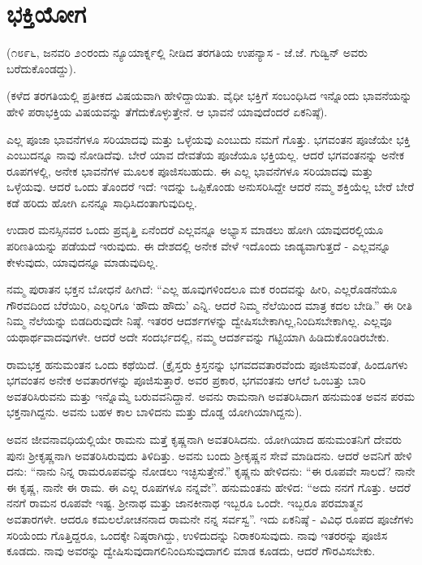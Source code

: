 
\chapter{ಭಕ್ತಿಯೋಗ}

(೧೮೯೬, ಜನವರಿ ೨೦ರಂದು ನ್ಯೂಯಾರ್ಕ್ನಲ್ಲಿ ನೀಡಿದ ತರಗತಿಯ ಉಪನ್ಯಾಸ - ಜೆ.ಜೆ. ಗುಡ್ವಿನ್ ಅವರು ಬರೆದುಕೊಂಡದ್ದು).

(ಕಳೆದ ತರಗತಿಯಲ್ಲಿ ಪ್ರತೀಕದ ವಿಷಯವಾಗಿ ಹೇಳಿದ್ದಾಯಿತು. ವೈಧೀ ಭಕ್ತಿಗೆ ಸಂಬಂಧಿಸಿದ ಇನ್ನೊಂದು ಭಾವನೆಯನ್ನು ಹೇಳಿ ಪರಾಭಕ್ತಿಯ ವಿಷಯವನ್ನು ತೆಗೆದುಕೊಳ್ಳುತ್ತೇನೆ. ಆ ಭಾವನೆ ಯಾವುದೆಂದರೆ ಏಕನಿಷ್ಠೆ).

ಎಲ್ಲ ಪೂಜಾ ಭಾವನೆಗಳೂ ಸರಿಯಾದವು ಮತ್ತು ಒಳ್ಳೆಯವು ಎಂಬುದು ನಮಗೆ ಗೊತ್ತು. ಭಗವಂತನ ಪೂಜೆಯೇ ಭಕ್ತಿ ಎಂಬುದನ್ನೂ ನಾವು ನೋಡಿದೆವು. ಬೇರೆ ಯಾವ ದೇವತೆಯ ಪೂಜೆಯೂ ಭಕ್ತಿಯಲ್ಲ. ಆದರೆ ಭಗವಂತನನ್ನು ಅನೇಕ ರೂಪಗಳಲ್ಲಿ, ಅನೇಕ ಭಾವನೆಗಳ ಮೂಲಕ ಪೂಜಿಸಬಹುದು. ಈ ಎಲ್ಲ ಭಾವನೆಗಳೂ ಸರಿಯಾದವು ಮತ್ತು ಒಳ್ಳೆಯವು. ಆದರೆ ಒಂದು ತೊಂದರೆ ಇದೆ: ಇದನ್ನು ಒಪ್ಪಿಕೊಂಡು ಅನುಸರಿಸಿದ್ದೇ ಆದರೆ ನಮ್ಮ ಶಕ್ತಿಯೆಲ್ಲ ಬೇರೆ ಬೇರೆ ಕಡೆ ಹರಿದು ಹೋಗಿ ಏನನ್ನೂ ಸಾಧಿಸಿದಂತಾಗುವುದಿಲ್ಲ.

ಉದಾರ ಮನಸ್ಸಿನವರ ಒಂದು ಪ್ರವೃತ್ತಿ ಏನೆಂದರೆ ಎಲ್ಲವನ್ನೂ ಅಭ್ಯಾಸ ಮಾಡಲು ಹೋಗಿ ಯಾವುದರಲ್ಲಿಯೂ ಪರಿಣತಿಯನ್ನು ಪಡೆಯದೆ ಇರುವುದು. ಈ ದೇಶದಲ್ಲಿ ಅನೇಕ ವೇಳೆ ಇದೊಂದು ಜಾಡ್ಯವಾಗುತ್ತದೆ - ಎಲ್ಲವನ್ನೂ ಕೇಳುವುದು, ಯಾವುದನ್ನೂ ಮಾಡುವುದಿಲ್ಲ.

ನಮ್ಮ ಪುರಾತನ ಭಕ್ತನ ಬೋಧನೆ ಹೀಗಿದೆ: “ಎಲ್ಲ ಹೂವುಗಳಿಂದಲೂ ಮಕ ರಂದವನ್ನು ಹೀರಿ, ಎಲ್ಲರೊಡನೆಯೂ ಗೌರವದಿಂದ ಬೆರೆಯಿರಿ, ಎಲ್ಲರಿಗೂ ‘ಹೌದು ಹೌದು’ ಎನ್ನಿ. ಆದರೆ ನಿಮ್ಮ ನೆಲೆಯಿಂದ ಮಾತ್ರ ಕದಲ ಬೇಡಿ.” ಈ ರೀತಿ ನಿಮ್ಮ ನೆಲೆಯನ್ನು ಬಿಡದಿರುವುದೇ ನಿಷ್ಠೆ. ಇತರರ ಆದರ್ಶಗಳನ್ನು ದ್ವೇಷಿಸಬೇಕಾಗಿಲ್ಲ,ನಿಂದಿಸಬೇಕಾಗಿಲ್ಲ. ಎಲ್ಲವೂ ಯಥಾರ್ಥವಾದವುಗಳೇ. ಆದರೆ ಅದೇ ಸಂದರ್ಭದಲ್ಲಿ, ನಮ್ಮ ಆದರ್ಶವನ್ನು ಗಟ್ಟಿಯಾಗಿ ಹಿಡಿದುಕೊಂಡಿರಬೇಕು.

ರಾಮಭಕ್ತ ಹನುಮಂತನ ಒಂದು ಕಥೆಯಿದೆ. (ಕ್ರೈಸ್ತರು ಕ್ರಿಸ್ತನನ್ನು ಭಗವದವತಾರವೆಂದು ಪೂಜಿಸುವಂತೆ, ಹಿಂದೂಗಳು ಭಗವಂತನ ಅನೇಕ ಅವತಾರಗಳನ್ನು ಪೂಜಿಸುತ್ತಾರೆ. ಅವರ ಪ್ರಕಾರ, ಭಗವಂತನು ಆಗಲೆ ಒಂಬತ್ತು ಬಾರಿ ಅವತರಿಸಿರುವನು ಮತ್ತು ಇನ್ನೊಮ್ಮೆ ಬರುವವನಿದ್ದಾನೆ. ಅವನು ರಾಮನಾಗಿ ಅವತರಿಸಿದಾಗ ಹನುಮಂತ ಅವನ ಪರಮ ಭಕ್ತನಾಗಿದ್ದನು. ಅವನು ಬಹಳ ಕಾಲ ಬಾಳಿದನು ಮತ್ತು ದೊಡ್ಡ ಯೋಗಿಯಾಗಿದ್ದನು).

ಅವನ ಜೀವನಾವಧಿಯಲ್ಲಿಯೇ ರಾಮನು ಮತ್ತೆ ಕೃಷ್ಣನಾಗಿ ಅವತರಿಸಿದನು. ಯೋಗಿಯಾದ ಹನುಮಂತನಿಗೆ ದೇವರು ಪುನಃ ಶ‍್ರೀಕೃಷ್ಣನಾಗಿ ಅವತರಿಸಿರುವುದು ತಿಳಿದಿತ್ತು. ಅವನು ಬಂದು ಶ‍್ರೀಕೃಷ್ಣನ ಸೇವೆ ಮಾಡಿದನು. ಆದರೆ ಅವನಿಗೆ ಹೇಳಿ ದನು: “ನಾನು ನಿನ್ನ ರಾಮರೂಪವನ್ನು ನೋಡಲು ಇಚ್ಛಿಸುತ್ತೇನೆ.” ಕೃಷ್ಣನು ಹೇಳಿದನು: “ಈ ರೂಪವೇ ಸಾಲದೆ? ನಾನೇ ಈ ಕೃಷ್ಣ, ನಾನೇ ಈ ರಾಮ. ಈ ಎಲ್ಲ ರೂಪಗಳೂ ನನ್ನವೇ”. ಹನುಮಂತನು ಹೇಳಿದ: “ಅದು ನನಗೆ ಗೊತ್ತು. ಆದರೆ ನನಗೆ ರಾಮನ ರೂಪವೇ ಇಷ್ಟ. ಶ‍್ರೀನಾಥ ಮತ್ತು ಜಾನಕೀನಾಥ ಇಬ್ಬರೂ ಒಂದೇ. ಇಬ್ಬರೂ ಪರಮಾತ್ಮನ ಅವತಾರಗಳೇ. ಆದರೂ ಕಮಲಲೋಚನನಾದ ರಾಮನೇ ನನ್ನ ಸರ್ವಸ್ವ”. ಇದು ಏಕನಿಷ್ಠೆ - ವಿವಿಧ ರೂಪದ ಪೂಜೆಗಳು ಸರಿಯೆಂದು ಗೊತ್ತಿದ್ದರೂ, ಒಂದಕ್ಕೇ ನಿಷ್ಠರಾಗಿದ್ದು, ಉಳಿದುದನ್ನು ನಿರಾಕರಿಸುವುದು. ನಾವು ಇತರರನ್ನು ಪೂಜಿಸ ಕೂಡದು. ನಾವು ಅವರನ್ನು ದ್ವೇಷಿಸುವುದಾಗಲಿನಿಂದಿಸುವುದಾಗಲಿ ಮಾಡ ಕೂಡದು, ಆದರೆ ಗೌರವಿಸಬೇಕು.

